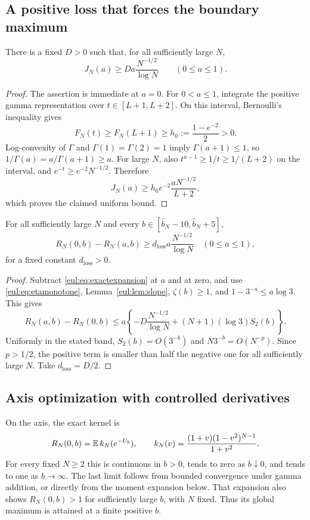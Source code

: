 \subsection{A positive loss that forces the boundary maximum}
\begin{lemma}\label{eul:lem:slope}
There is a fixed $D>0$ such that, for all sufficiently large $N$,
\[
 J_N(a)\geq D a\frac{N^{-1/2}}{\log N}
 \qquad(0\leq a\leq1).
\]
\end{lemma}
\begin{proof}
The assertion is immediate at $a=0$.  For $0<a\leq1$, integrate the
positive gamma representation over $t\in[L+1,L+2]$.
On this interval, Bernoulli's inequality gives
\[
 F_N(t)\geq F_N(L+1)\geq h_0:=\frac{1-e^{-2}}2>0.
\]
Log-convexity of $\Gamma$ and $\Gamma(1)=\Gamma(2)=1$ imply
$\Gamma(a+1)\leq1$, so $1/\Gamma(a)=a/\Gamma(a+1)\geq a$.
For large $N$, also $t^{a-1}\geq1/t\geq1/(L+2)$ on the interval,
and $e^{-t}\geq e^{-2}N^{-1/2}$.  Therefore
\[
 J_N(a)\geq h_0e^{-2}\frac{aN^{-1/2}}{L+2},
\]
which proves the claimed uniform bound.
\end{proof}

\begin{proposition}\label{eul:prop:decrease}
For all sufficiently large $N$ and every
$b\in[\widehat b_N-10,\widehat b_N+5]$,
\begin{equation}\label{eul:eq:gap-a}
 R_N(0,b)-R_N(a,b)
 \geq d_{\mathrm{loss}} a\frac{N^{-1/2}}{\log N}
 \quad(0\leq a\leq1),
\end{equation}
for a fixed constant $d_{\mathrm{loss}}>0$.
\end{proposition}
\begin{proof}
Subtract \eqref{eul:eq:exactexpansion} at $a$ and at zero, and use
\eqref{eul:eq:etamonotone}, Lemma~\ref{eul:lem:slope}, $\zeta(b)\geq1$, and
$1-3^{-a}\leq a\log3$.  This gives
\[
 R_N(a,b)-R_N(0,b)
 \leq a\left\{
 -D\frac{N^{-1/2}}{\log N}+(N+1)(\log3)S_2(b)\right\}.
\]
Uniformly in the stated band,
$S_2(b)=O(3^{-b})$ and $N3^{-b}=O(N^{-p})$.
Since $p>1/2$, the positive term is smaller than half the negative
one for all sufficiently large $N$.  Take $d_{\mathrm{loss}}=D/2$.
\end{proof}

\subsection{Axis optimization with controlled derivatives}
On the axis, the exact kernel is
\[
 R_N(0,b)=\operatorname{\mathbb E} k_N(e^{-U_b}),\qquad
 k_N(v)=\frac{(1+v)(1-v^2)^{N-1}}{1+v^2}.
\]
For every fixed $N\geq2$ this is continuous in $b>0$, tends to zero
as $b\downarrow0$, and tends to one as $b\to\infty$.
The last limit follows from bounded convergence under gamma addition,
or directly from the moment expansion below.  That expansion also
shows $R_N(0,b)>1$ for sufficiently large $b$, with $N$ fixed.
Thus its global maximum is attained at a finite positive $b$.

